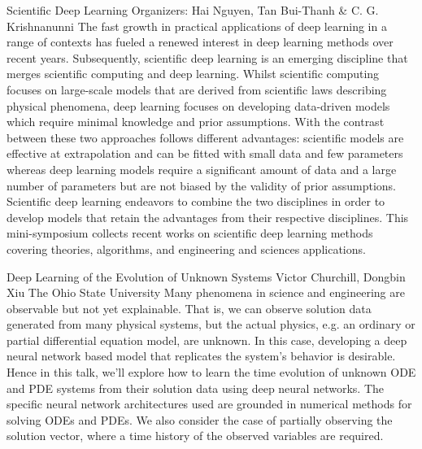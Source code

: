\label{mini26}


\miniabs
{Scientific Deep Learning}
{Organizers: Hai Nguyen, Tan Bui-Thanh \& C. G. Krishnanunni}
{The fast growth in practical applications of deep learning in a range of contexts has fueled a renewed interest in deep learning methods over recent years. Subsequently, scientific deep learning is an emerging discipline that merges scientific computing and deep learning. Whilst scientific computing focuses on large-scale models that are derived from scientific laws describing physical phenomena, deep learning focuses on developing data-driven models which require minimal knowledge and prior assumptions. With the contrast between these two approaches follows different advantages: scientific models are effective at extrapolation and can be fitted with small data and few parameters whereas deep learning models require a significant amount of data and a large number of parameters but are not biased by the validity of prior assumptions. Scientific deep learning endeavors to combine the two disciplines in order to develop models that retain the advantages from their respective disciplines. This mini-symposium collects recent works on scientific deep learning methods covering theories, algorithms, and engineering and sciences applications.}


\vspace{1.5ex}
\abs
{Deep Learning of the Evolution of Unknown Systems}
{Victor Churchill, Dongbin Xiu}
{The Ohio State University}
{Many phenomena in science and engineering are observable but not yet explainable. That is, we can observe solution data generated from many physical systems, but the actual physics, e.g. an ordinary or partial differential equation model, are unknown. In this case, developing a deep neural network based model that replicates the system’s behavior is desirable. Hence in this talk, we’ll explore how to learn the time evolution of unknown ODE and PDE systems from their solution data using deep neural networks. The specific neural network architectures used are grounded in numerical methods for solving ODEs and PDEs. We also consider the case of partially observing the solution vector, where a time history of the observed variables are required.}


